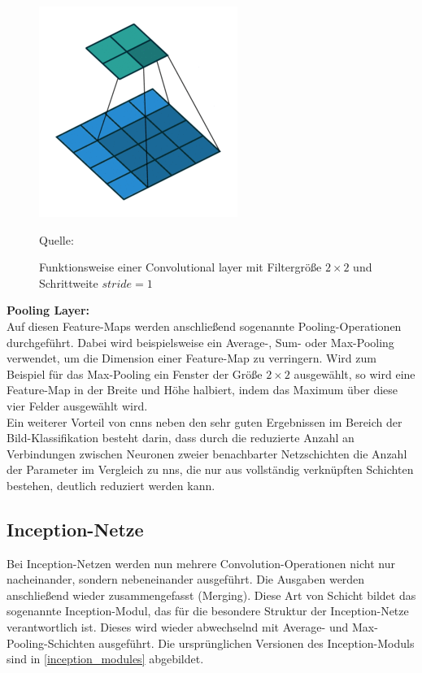 \documentclass[twoside, 12pt,a4paper]{book}
\newcommand{\source}[1]{\caption*{\hfill Quelle: {#1}} }
\numberwithin{equation}{section}
\begin{document}
\begin{figure}[ht]
		\includegraphics[width=0.1\textheight]{frame_3_delay-1s.png}
		\caption[Funktionsweise einer Convolutional Layer]{Funktionsweise einer Convolutional layer mit Filtergröße $2\times 2$ und Schrittweite $stride=1$}
		
		\label{im:convolution}
		\source{\cite{convolution_matlab}}
	\end{figure}
	

	\noindent\textbf{Pooling Layer:}\\
	\noindent Auf diesen Feature-Maps werden anschließend sogenannte Pooling-O\-pe\-ra\-tio\-nen durchgeführt. Dabei wird beispielsweise ein Average-, Sum- oder Max-Pooling verwendet, um die Dimension einer Feature-Map zu verringern. Wird zum Beispiel für das Max-Pooling ein Fenster der Größe $2 \times 2$ ausgewählt, so wird eine Feature-Map in der Breite und Höhe halbiert, indem das Maximum über diese vier Felder ausgewählt wird.\\
		
	\noindent Ein weiterer Vorteil von \acp{cnn} neben den sehr guten Ergebnissen im Bereich der Bild-Klassifikation besteht darin, dass durch die reduzierte Anzahl an Verbindungen zwischen Neuronen zweier benachbarter Netzschichten die Anzahl der Parameter im Vergleich zu \acp{nn}, die nur aus vollständig verknüpften Schichten bestehen, deutlich reduziert werden kann.
	
	\subsection{Inception-Netze}\label{chapter:inception}
	Bei Inception-Netzen werden nun mehrere Convolution-Operationen nicht nur nacheinander, sondern nebeneinander ausgeführt. Die Ausgaben werden anschließend wieder zusammengefasst (Merging). Diese Art von Schicht bildet das sogenannte Inception-Modul, das für die besondere Struktur der Inception-Netze verantwortlich ist. Dieses wird wieder abwechselnd mit Av\-er\-age- und Max-Pooling-Schichten ausgeführt. Die ursprünglichen Versionen des Inception-Moduls sind in \autoref{inception_modules} abgebildet.
	
\end{document}
